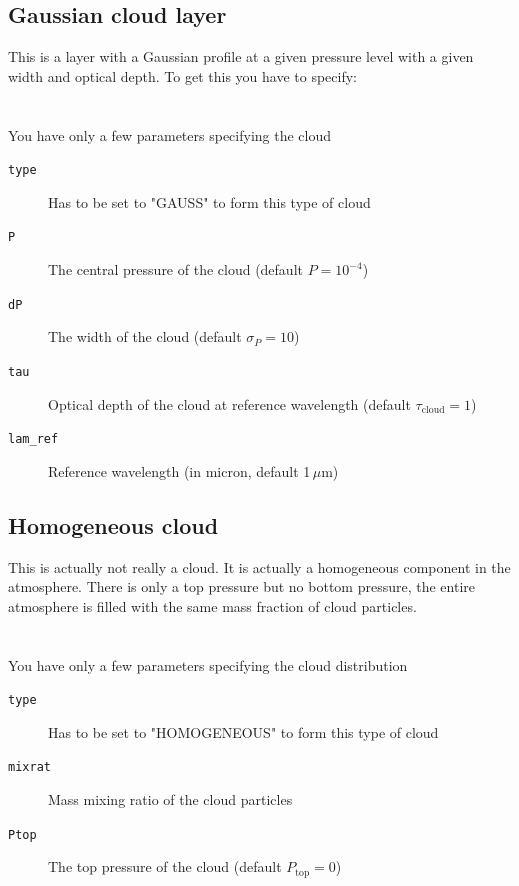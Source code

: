 \documentclass[12pt]{article}
\begin{document}
\subsection{Gaussian cloud layer}

This is a layer with a Gaussian profile at a given pressure level with a given width and optical depth. To get this you have to specify:
\\
\\
\\
You have only a few parameters specifying the cloud

\begin{description}
\item[\texttt{type}]
Has to be set to "GAUSS" to form this type of cloud
\item[\texttt{P}]
The central pressure of the cloud (default $P=10^{-4}$)
\item[\texttt{dP}]
The width of the cloud (default $\sigma_P=10$)
\item[\texttt{tau}]
Optical depth of the cloud at reference wavelength (default $\tau_\mathrm{cloud}=1$)
\item[\texttt{lam\_ref}]
Reference wavelength (in micron, default 1\,$\mu$m)
\end{description}

\subsection{Homogeneous cloud}

This is actually not really a cloud. It is actually a homogeneous component in the atmosphere. There is only a top pressure but no bottom pressure, the entire atmosphere is filled with the same mass fraction of cloud particles.
\\
\\
\\
You have only a few parameters specifying the cloud distribution

\begin{description}
\item[\texttt{type}]
Has to be set to "HOMOGENEOUS" to form this type of cloud
\item[\texttt{mixrat}]
Mass mixing ratio of the cloud particles
\item[\texttt{Ptop}]
The top pressure of the cloud (default $P_\mathrm{top}=0$)
\end{description}
\end{document}
